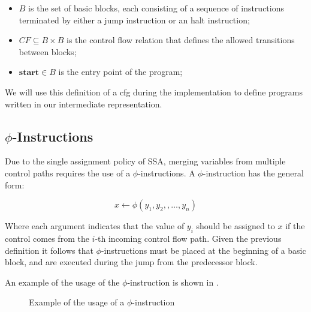 \begin{itemize}
    \item $B$ is the set of basic blocks, each consisting of a sequence of instructions terminated by either a jump instruction or an halt instruction;
    \item $CF \subseteq B \times B$ is the control flow relation that defines the allowed transitions between blocks;
    \item $\textbf{start} \in B$ is the entry point of the program;
\end{itemize}

We will use this definition of a \gls{cfg} during the implementation to define programs written in our intermediate representation.

\subsection{$\phi$-Instructions}
\label{subsec:phi}

Due to the single assignment policy of SSA, merging variables from multiple control paths requires the use of a $\phi$-instructions. A $\phi$-instruction has the general form:

\[
x \leftarrow \phi(y_1, y_2, , \dots, y_n)
\]

Where each argument indicates that the value of $y_i$ should be assigned to $x$ if the control comes from the $i$-th incoming control flow path. Given the previous definition it follows that $\phi$-instructions must be placed at the beginning of a basic block, and are executed during the jump from the predecessor block.

An example of the usage of the $\phi$-instruction is shown in .

\begin{figure}[ht]
    \centering
    \caption{Example of the usage of a $\phi$-instruction}
    \label{fig:phi-usage}
\end{figure}

